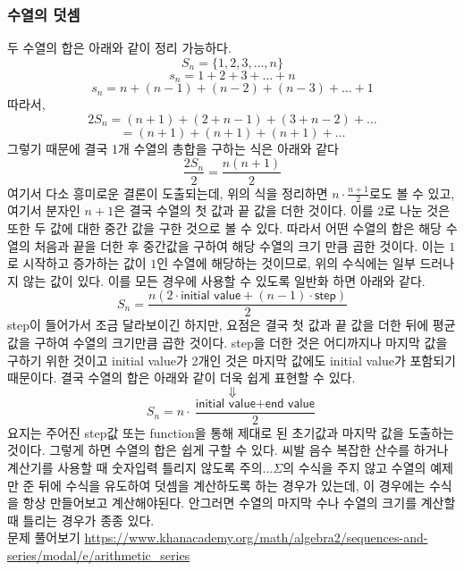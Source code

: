 \documentclass{article}
\begin{document}
\subsubsection{수열의 덧셈}
두 수열의 합은 아래와 같이 정리 가능하다.
$$S_n=\{1,2,3,\dots,n\}$$
$$s_n=1+2+3+\dots+n$$
$$s_n=n+(n-1)+(n-2)+(n-3)+\dots+1$$
따라서,
$$2S_n=(n+1)+(2+n-1)+(3+n-2)+\dots$$
$$=(n+1)+(n+1)+(n+1)+\dots$$
그렇기 때문에 결국 1개 수열의 총합을 구하는 식은 아래와 같다
$$\frac{2S_n}{2}=\frac{n(n+1)}{2}$$
여기서 다소 흥미로운 결론이 도출되는데, 위의 식을 정리하면 $n\cdot\frac{n+1}{2}$로도 볼 수 있고, 여기서 분자인 $n+1$은 결국 수열의 첫 값과 끝 값을 더한 것이다. 이를 $2$로 나눈 것은 또한 두 값에 대한 중간 값을 구한 것으로 볼 수 있다. 따라서 어떤 수열의 합은 해당 수열의 처음과 끝을 더한 후 중간값을 구하여 해당 수열의 크기 만큼 곱한 것이다. 이는 $1$로 시작하고 증가하는 값이 $1$인 수열에 해당하는 것이므로, 위의 수식에는 일부 드러나지 않는 값이 있다. 이를 모든 경우에 사용할 수 있도록 일반화 하면 아래와 같다.
$$S_n=\frac{n(2\cdot\textsf{initial value}+(n-1)\cdot\textsf{step})}{2}$$ step이 들어가서 조금 달라보이긴 하지만, 요점은 결국 첫 값과 끝 값을 더한 뒤에 평균 값을 구하여 수열의 크기만큼 곱한 것이다. step을 더한 것은 어디까지나 마지막 값을 구하기 위한 것이고 initial value가 2개인 것은 마지막 값에도 initial value가 포함되기 때문이다. 결국 수열의 합은 아래와 같이 더욱 쉽게 표현할 수 있다.
$$\Downarrow$$
$$S_n=n\cdot\frac{\textsf{initial value} + \textsf{end value}}{2}$$
요지는 주어진 step값 또는 function을 통해 제대로 된 초기값과 마지막 값을 도출하는 것이다. 그렇게 하면 수열의 합은 쉽게 구할 수 있다.
{\color{red}씨발 음수} 복잡한 산수를 하거나 계산기를 사용할 때 숫자입력 틀리지 않도록 주의...$\Sigma$의 수식을 주지 않고 수열의 예제만 준 뒤에 수식을 유도하여 덧셈을 계산하도록 하는 경우가 있는데, 이 경우에는 수식을 항상 만들어보고 계산해야된다. 안그러면 수열의 마지막 수나 수열의 크기를 계산할 때 틀리는 경우가 종종 있다.\\
문제 풀어보기 \url{https://www.khanacademy.org/math/algebra2/sequences-and-series/modal/e/arithmetic_series}\\
\end{document}
